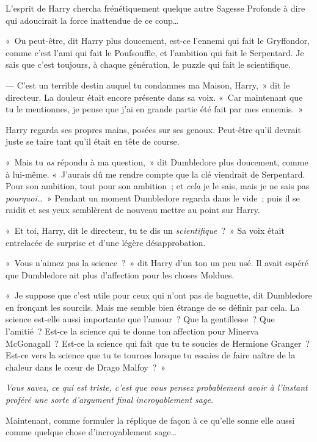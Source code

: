 L'esprit de Harry chercha frénétiquement quelque autre Sagesse Profonde à dire qui adoucirait la force inattendue de ce coup…

«~Ou peut-être, dit Harry plus doucement, est-ce l'ennemi qui fait le Gryffondor, comme c'est l'ami qui fait le Poufsouffle, et l'ambition qui fait le Serpentard. Je sais que c'est toujours, à chaque génération, le puzzle qui fait le scientifique.

--- C'est un terrible destin auquel tu condamnes ma Maison, Harry,~» dit le directeur. La douleur était encore présente dans sa voix. «~Car maintenant que tu le mentionnes, je pense que j'ai en grande partie été fait par mes ennemis.~»

Harry regarda ses propres mains, posées sur ses genoux. Peut-être qu'il devrait juste se taire tant qu'il était en tête de course.

«~Mais tu \emph{as} répondu à ma question,~» dit Dumbledore plus doucement, comme à lui-même. «~J'aurais dû me rendre compte que la clé viendrait de Serpentard. Pour son ambition, tout pour son ambition~; et \emph{cela} je le sais, mais je ne sais pas \emph{pourquoi}…~» Pendant un moment Dumbledore regarda dans le vide~; puis il se raidit et ses yeux semblèrent de nouveau mettre au point sur Harry.

«~Et toi, Harry, dit le directeur, tu te dis un \emph{scientifique}~?~» Sa voix était entrelacée de surprise et d'une légère désapprobation.

«~Vous n'aimez pas la science~?~» dit Harry d'un ton un peu usé. Il avait espéré que Dumbledore ait plus d'affection pour les choses Moldues.

«~Je suppose que c'est utile pour ceux qui n'ont pas de baguette, dit Dumbledore en fronçant les sourcils. Mais me semble bien étrange de se définir par cela. La science est-elle aussi importante que l'amour~? Que la gentillesse~? Que l'amitié~? Est-ce la science qui te donne ton affection pour Minerva McGonagall~? Est-ce la science qui fait que tu te soucies de Hermione Granger~? Est-ce vers la science que tu te tournes lorsque tu essaies de faire naître de la chaleur dans le cœur de Drago Malfoy~?~»

\emph{Vous savez, ce qui est triste, c'est que vous pensez probablement avoir à l'instant proféré une sorte d'argument final incroyablement sage.}

Maintenant, comme formuler la réplique de façon à ce qu'elle sonne elle aussi comme quelque chose d'incroyablement sage…

